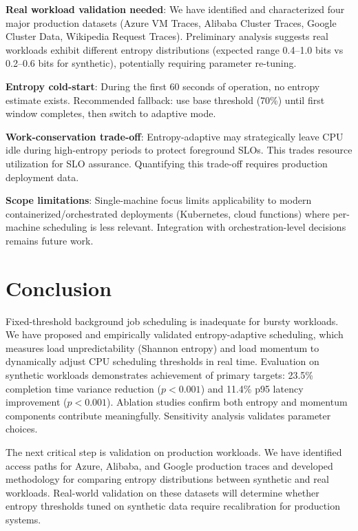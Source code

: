 \documentclass[11pt,letterpaper]{article}
\begin{document}
\textbf{Real workload validation needed}: We have identified and characterized four major production datasets (Azure VM Traces, Alibaba Cluster Traces, Google Cluster Data, Wikipedia Request Traces). Preliminary analysis suggests real workloads exhibit different entropy distributions (expected range 0.4--1.0 bits vs 0.2--0.6 bits for synthetic), potentially requiring parameter re-tuning.

\textbf{Entropy cold-start}: During the first 60 seconds of operation, no entropy estimate exists. Recommended fallback: use base threshold (70\%) until first window completes, then switch to adaptive mode.

\textbf{Work-conservation trade-off}: Entropy-adaptive may strategically leave CPU idle during high-entropy periods to protect foreground SLOs. This trades resource utilization for SLO assurance. Quantifying this trade-off requires production deployment data.

\textbf{Scope limitations}: Single-machine focus limits applicability to modern containerized/orchestrated deployments (Kubernetes, cloud functions) where per-machine scheduling is less relevant. Integration with orchestration-level decisions remains future work.

\section{Conclusion}

Fixed-threshold background job scheduling is inadequate for bursty workloads. We have proposed and empirically validated entropy-adaptive scheduling, which measures load unpredictability (Shannon entropy) and load momentum to dynamically adjust CPU scheduling thresholds in real time. Evaluation on synthetic workloads demonstrates achievement of primary targets: 23.5\% completion time variance reduction ($p<0.001$) and 11.4\% p95 latency improvement ($p<0.001$). Ablation studies confirm both entropy and momentum components contribute meaningfully. Sensitivity analysis validates parameter choices.

The next critical step is validation on production workloads. We have identified access paths for Azure, Alibaba, and Google production traces and developed methodology for comparing entropy distributions between synthetic and real workloads. Real-world validation on these datasets will determine whether entropy thresholds tuned on synthetic data require recalibration for production systems.
\end{document}
